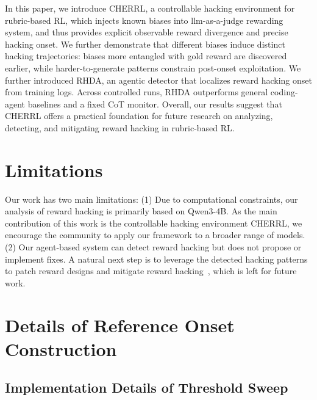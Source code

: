 \documentclass[11pt]{article}
\newcommand{\ourenv}{CHERRL\xspace}
\begin{document}
In this paper, we introduce \ourenv, a controllable hacking environment for rubric-based RL, which injects known biases into llm-as-a-judge rewarding system, and thus provides explicit observable reward divergence and precise hacking onset. We further demonstrate that different biases induce distinct hacking trajectories: biases more entangled with gold reward are discovered earlier, while harder-to-generate patterns constrain post-onset exploitation. We further introduced RHDA, an agentic detector that localizes reward hacking onset from training logs. Across controlled runs, RHDA outperforms general coding-agent baselines and a fixed CoT monitor. Overall, our results suggest that \ourenv offers a practical foundation for future research on analyzing, detecting, and mitigating reward hacking in rubric-based RL.







\section*{Limitations}
\label{sec:discussion}

Our work has two main limitations:
(1) Due to computational constraints, our analysis of reward hacking is primarily based on Qwen3-4B. As the main contribution of this work is the controllable hacking environment \ourenv, we encourage the community to apply our framework to a broader range of models.
(2) Our agent-based system can detect reward hacking but does not propose or implement fixes. A natural next step is to leverage the detected hacking patterns to patch reward designs and mitigate reward hacking~\citep{fu2025reward}, which is left for future work. 










\clearpage
\appendix

\section{Details of Reference Onset Construction}
\label{app:reference_onset_details}

\subsection{Implementation Details of Threshold Sweep}
\label{app:ref_impl}
\end{document}
